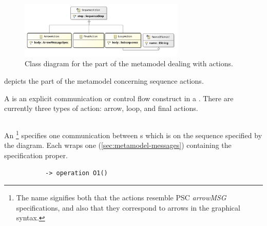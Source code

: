 \begin{figure}
	\centering
	\includegraphics[width=0.7\textwidth]{diagrams/Actions}
	\caption{Class diagram for the part of the \langname{} metamodel dealing with actions.}
	\label{fig:metamodel-actions}
\end{figure}

 depicts the part of the metamodel concerning
sequence actions.

A \msequenceaction{} is an explicit communication or control flow construct in a
\msubsequence.  There are currently three types of action: arrow, loop, and
final actions.

\subsection{\marrowaction}

An \marrowaction\footnote{The name signifies both that the actions resemble
PSC \emph{arrowMSG} specifications, and also that they correspond to arrows in
the graphical syntax.} specifies one communication between \mactor s which is on
the sequence specified by the diagram.  Each \marrowaction{} wraps one
\marrowmessagespec{} (\cref{sec:metamodel-messages})
containing the specification proper.

\begin{figure}[h!]
\begin{subfigure}[t]{\egtextwidth}
\begin{lstlisting}[style=Example]
-> operation O1()
\end{lstlisting}
\end{subfigure}
\hfill
\begin{subfigure}[t]{\eggraphicalwidth}
\gsecaption
\centering
{}
\end{subfigure}

\end{figure}

